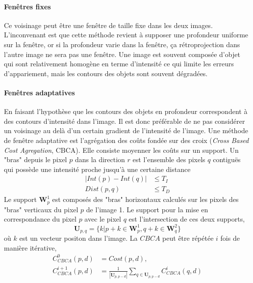 \documentclass[../main/These_Mathias_Paget.tex]{subfiles}
\begin{document}
\paragraph*{Fenêtres fixes}
Ce voisinage peut être une fenêtre de taille fixe dans les deux images. L’inconvenant est que cette méthode revient à supposer une profondeur uniforme sur la fenêtre, or si la profondeur varie dans la fenêtre, ça rétroprojection dans l'autre image ne sera pas une fenêtre. Une image est souvent composée d'objet qui sont relativement homogène en terme d'intensité ce qui limite les erreurs d’appariement, mais les contours des objets sont souvent dégradées.

\paragraph*{Fenêtres adaptatives}
En faisant l'hypothèse que les contours des objets en profondeur correspondent à des contours d’intensité dans l'image. Il est donc préférable de ne pas considérer un voisinage au delà d'un certain gradient de l’intensité de l'image. Une méthode de fenêtre adaptative est l'agrégation des coûts fondée sur des croix (\textit{Cross Based Cost Agregation}, CBCA). Elle consiste moyenner les coûts sur un support. Un "bras" depuis le pixel $p$ dans la direction $r$ est l'ensemble des pixels $q$ contiguës qui possède une intensité proche jusqu'à une certaine distance
\begin{equation}
\begin{aligned}
|Int(p) - Int(q)| & \leq T_I \\
Dist(p,q) & \leq T_D
\end{aligned}
\end{equation}
Le support $\boldsymbol{W}^1_p$ est composés des "bras" horizontaux calculés sur les pixels des "bras" verticaux du pixel $p$ de l'image 1. Le support pour la mise en correspondance du pixel $p$ avec le pixel $q$ est l'intersection de ces deux supports,
\begin{equation}
\boldsymbol{U}_{p,q} = \{  k | p+k \in \boldsymbol{W}^1_p, q+k \in \boldsymbol{W}^2_q  \}
\end{equation}
où $k$ est un vecteur positon dans l'image. La $CBCA$ peut être répétée $i$ fois de manière itérative,
\begin{align}
C^0_{CBCA}(p,d) &= Cost(p,d), \\
C^{i{+}1}_{CBCA}(p,d) &= \frac{1}{|\boldsymbol{U}_{p,p{-}d}|} \sum_{q \in \boldsymbol{U}_{p,p{-}d}}{C^{i}_{CBCA}(q,d)}
\end{align}
\end{document}
